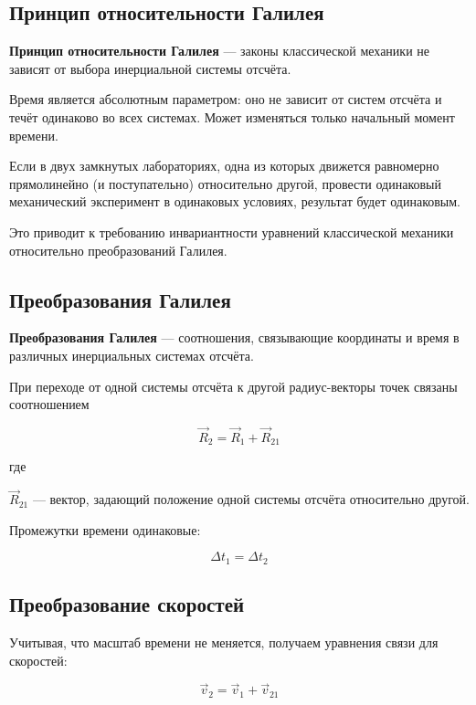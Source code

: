 \documentclass[a4paper,12pt]{article}
\begin{document}
\subsection*{Принцип относительности Галилея}

\begin{definitionbox}
\textbf{Принцип относительности Галилея} — законы классической механики не зависят от выбора инерциальной системы отсчёта.
\end{definitionbox}

Время является абсолютным параметром: оно не зависит от систем отсчёта и течёт одинаково во всех системах. Может изменяться только начальный момент времени.

Если в двух замкнутых лабораториях, одна из которых движется равномерно прямолинейно (и поступательно) относительно другой, провести одинаковый механический эксперимент в одинаковых условиях, результат будет одинаковым.

Это приводит к требованию инвариантности уравнений классической механики относительно преобразований Галилея.

\subsection*{Преобразования Галилея}

\begin{definitionbox}
\textbf{Преобразования Галилея} — соотношения, связывающие координаты и время в различных инерциальных системах отсчёта.
\end{definitionbox}

При переходе от одной системы отсчёта к другой радиус-векторы точек связаны соотношением

\[
\vec R_2 = \vec R_1 + \vec R_{21}
\]

где

$\vec R_{21}$ — вектор, задающий положение одной системы отсчёта относительно другой.

Промежутки времени одинаковые:

\[
\Delta t_1 = \Delta t_2
\]

\subsection*{Преобразование скоростей}

Учитывая, что масштаб времени не меняется, получаем уравнения связи для скоростей:

\[
\vec v_2 = \vec v_1 + \vec v_{21}
\]
\end{document}
